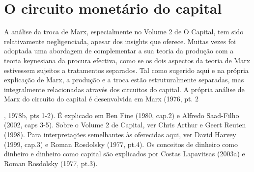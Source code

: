 \section{O circuito monetário do capital}
 \par 
A análise da troca de Marx, especialmente no Volume {\color{blue}2} de O Capital, tem sido relativamente negligenciada, apesar dos insights que oferece. Muitas vezes foi adoptada uma abordagem de complementar a sua teoria da produção com a teoria keynesiana da procura efectiva, como se os dois aspectos da teoria de Marx estivessem sujeitos a tratamentos separados. Tal como sugerido aqui e na própria explicação de Marx, a produção e a troca estão estruturalmente separadas, mas integralmente relacionadas através dos circuitos do capital. A própria análise de Marx do circuito do capital é desenvolvida em Marx (1976, pt. {\color{blue} 2 } {\par} , 1978b, pts 1-2). É explicado em Ben Fine (1980, cap.{\color{blue}2}) e Alfredo Saad-Filho (2002, caps 3-5). Sobre o Volume {\color{blue}2} de Capital, ver Chris Arthur e Geert Reuten (1998). Para interpretações semelhantes às oferecidas aqui, ver David Harvey (1999, cap.{\color{blue}3}) e Roman Rosdolsky (1977, pt.{\color{blue}4}). Os conceitos de dinheiro como dinheiro e dinheiro como capital são explicados por Costas Lapavitsas (2003a) e Roman Rosdolsky (1977, pt.{\color{blue}3}).